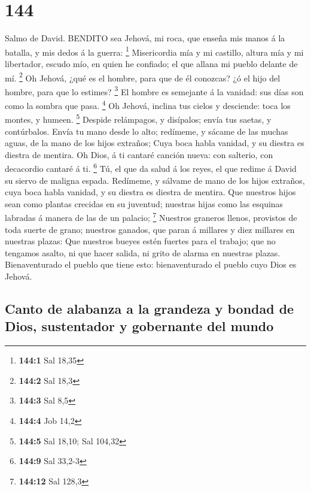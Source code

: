 \hypertarget{section-143}{%
\section{144}\label{section-143}}

 Salmo de David. BENDITO sea Jehová, mi roca, que enseña mis
manos á la batalla, y mis dedos á la guerra: \footnote{\textbf{144:1}
  Sal 18,35}  Misericordia mía y mi castillo, altura mía y
mi libertador, escudo mío, en quien he confiado; el que allana mi pueblo
delante de mí. \footnote{\textbf{144:2} Sal 18,3}  Oh
Jehová, ¿qué es el hombre, para que de él conozcas? ¿ó el hijo del
hombre, para que lo estimes? \footnote{\textbf{144:3} Sal 8,5}
 El hombre es semejante á la vanidad: sus días son como la
sombra que pasa. \footnote{\textbf{144:4} Job 14,2}  Oh
Jehová, inclina tus cielos y desciende: toca los montes, y humeen.
\footnote{\textbf{144:5} Sal 18,10; Sal 104,32}  Despide
relámpagos, y disípalos; envía tus saetas, y contúrbalos. 
Envía tu mano desde lo alto; redímeme, y sácame de las muchas aguas, de
la mano de los hijos extraños;  Cuya boca habla vanidad, y
su diestra es diestra de mentira.  Oh Dios, á ti cantaré
canción nueva: con salterio, con decacordio cantaré á ti. \footnote{\textbf{144:9}
  Sal 33,2-3}  Tú, el que da salud á los reyes, el que
redime á David su siervo de maligna espada.  Redímeme, y
sálvame de mano de los hijos extraños, cuya boca habla vanidad, y su
diestra es diestra de mentira.  Que nuestros hijos sean
como plantas crecidas en su juventud; nuestras hijas como las esquinas
labradas á manera de las de un palacio; \footnote{\textbf{144:12} Sal
  128,3}  Nuestros graneros llenos, provistos de toda
suerte de grano; nuestros ganados, que paran á millares y diez millares
en nuestras plazas:  Que nuestros bueyes estén fuertes para
el trabajo; que no tengamos asalto, ni que hacer salida, ni grito de
alarma en nuestras plazas.  Bienaventurado el pueblo que
tiene esto: bienaventurado el pueblo cuyo Dios es Jehová.

\hypertarget{canto-de-alabanza-a-la-grandeza-y-bondad-de-dios-sustentador-y-gobernante-del-mundo}{%
\subsection{Canto de alabanza a la grandeza y bondad de Dios,
sustentador y gobernante del
mundo}\label{canto-de-alabanza-a-la-grandeza-y-bondad-de-dios-sustentador-y-gobernante-del-mundo}}

